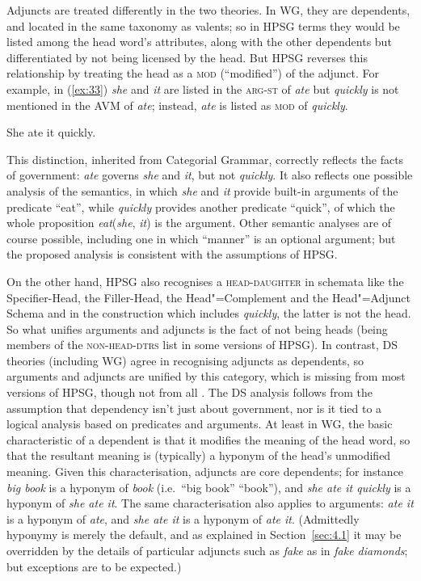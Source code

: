 \documentclass[output=paper,biblatex,babelshorthands,newtxmath,draftmode,colorlinks,citecolor=brown]{langscibook}
\begin{document}
Adjuncts are treated differently in the two theories. In WG, they are dependents, and located in the
same taxonomy as valents; so in HPSG terms they would be listed among the head word's attributes,
along with the other dependents but differentiated by not being licensed by the head. But HPSG
reverses this relationship by treating the head as a \textsc{mod} (``modified'') of the adjunct. For
example, in (\ref{ex:33}) \emph{she} and \emph{it} are listed in the \textsc{arg-st} of \emph{ate}
but \emph{quickly} is not mentioned in the AVM of \emph{ate}; instead, \emph{ate} is listed as
\textsc{mod} of \emph{quickly}.

\begin{exe}
	\ex \label{ex:33} She ate it quickly.
\end{exe}

\noindent
This distinction, inherited from Categorial Grammar, correctly reflects the facts of government:
\emph{ate} governs \emph{she} and \emph{it}, but not \emph{quickly}. It also reflects one possible
analysis of the semantics, in which \emph{she} and \emph{it} provide built-in arguments of the
predicate ``eat'', while \emph{quickly} provides another predicate ``quick'', of which the whole
proposition \emph{eat}(\emph{she}, \emph{it}) is the argument. Other semantic analyses are of course
possible, including one in which ``manner'' is an optional argument; but the proposed analysis is
consistent with the assumptions of HPSG.


On the other hand, HPSG also recognises a \textsc{head-daughter} in schemata like
the Specifier-Head, the Filler-Head, the Head"=Complement and the Head"=Adjunct Schema and in
the construction which includes \emph{quickly}, the latter is not the head. So what unifies
arguments and adjuncts is the fact of not being heads (being members of the \textsc{non-head-dtrs}
list in some versions of HPSG). In contrast, DS theories (including WG) agree
in recognising adjuncts as dependents, so arguments and adjuncts are unified by this category, which
is missing from most versions of HPSG, though not from all \citep*{BMS2001a}. The DS analysis follows
from the assumption that dependency isn't just about government, nor is it tied to a logical
analysis based on predicates and arguments. At least in WG, the basic characteristic of a dependent
is that it modifies the meaning of the head word, so that the resultant meaning is (typically) a
hyponym of the head's unmodified meaning. Given this characterisation, adjuncts are core dependents;
for instance \emph{big book} is a hyponym of \emph{book} (i.e.\ ``big book''  ``book''), and
\emph{she ate it quickly} is a hyponym of \emph{she ate it}. The same characterisation also applies
to arguments: \emph{ate it} is a hyponym of \emph{ate}, and \emph{she ate it} is a hyponym of
\emph{ate it}. (Admittedly hyponymy is merely the default, and as explained in Section~\ref{sec:4.1}
it may be overridden by the details of particular adjuncts such as \emph{fake} as in \emph{fake
  diamonds}; but exceptions are to be expected.)
\end{document}

